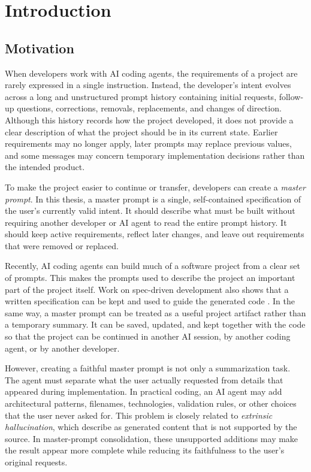 \chapter{Introduction}
\label{chap:introduction}

\section{Motivation}
\label{sec:motivation}

When developers work with AI coding agents, the requirements of a project are
rarely expressed in a single instruction. Instead, the developer's intent
evolves across a long and unstructured prompt history containing initial
requests, follow-up questions, corrections, removals, replacements, and changes
of direction. Although this history records how the project developed, it does
not provide a clear description of what the project should be in its current
state. Earlier requirements may no longer apply, later prompts may replace
previous values, and some messages may concern temporary implementation
decisions rather than the intended product.

To make the project easier to continue or transfer, developers can create a
\emph{master prompt}. In this thesis, a master prompt is a single,
self-contained specification of the user's currently valid intent. It should
describe what must be built without requiring another developer or AI agent to
read the entire prompt history. It should keep active requirements, reflect
later changes, and leave out requirements that were removed or replaced.

Recently, AI coding agents can build much of a software project from a clear set
of prompts. This makes the prompts used to describe the project an important
part of the project itself. Work on spec-driven development also shows that a
written specification can be kept and used to guide the generated code
\citep{piskala2026specdriven}. In the same way, a master prompt can be treated
as a useful project artifact rather than a temporary summary. It can be saved,
updated, and kept together with the code so that the project can be continued
in another AI session, by another coding agent, or by another developer.

However, creating a faithful master prompt is not only a summarization task.
The agent must separate what the user actually requested from details that
appeared during implementation. In practical coding, an AI agent may add architectural
patterns, filenames, technologies, validation rules, or other choices that the
user never asked for. This problem is closely related to \emph{extrinsic hallucination}, which
\citet{ji2023survey} describe as generated content that is not supported by
the source. In master-prompt consolidation, these unsupported additions may
make the result appear more complete while reducing its faithfulness to the
user's original requests.

